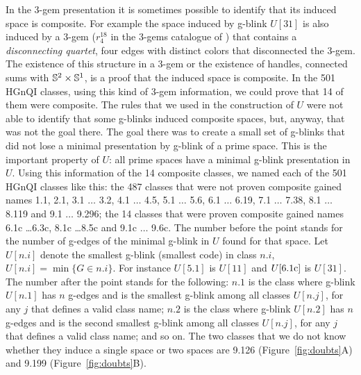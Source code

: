 \enlargethispage{0.5cm}
In the 3-gem presentation it is sometimes possible to identify that
its induced space is composite. For example the space induced by g-blink $U[31]$
is also induced by a 3-gem ($r_4^{18}$ in the 3-gems catalogue of \cite{Lins1995}) that
contains a {\it disconnecting quartet}, \ie four edges with distinct colors
that disconnected the 3-gem. The existence of this structure in a 3-gem
or the existence of handles, \ie connected sums with $\mathbb{S}^2 \times \mathbb{S}^1$,
is a proof that the induced space is composite. In the 501 HGnQI classes, using
this kind of 3-gem information, we could prove that 14 of them were composite. The
rules that we used in the construction of $U$ were not able to identify that
some g-blinks induced composite spaces, but, anyway, that was not the goal there. The
goal there was to create a small set of g-blinks that did not lose a minimal
presentation by g-blink of a prime space. This is the important property of $U$:
all prime spaces have a minimal g-blink presentation in $U$. Using this information
of the 14 composite classes, we named each of the 501 HGnQI classes like this:
the 487 classes that were not proven composite gained names 1.1, 2.1, 3.1  $\ldots$  3.2,
4.1 $\ldots$ 4.5, 5.1 $\ldots$ 5.6, 6.1 $\ldots$ 6.19, 7.1 $\ldots$ 7.38, 8.1 $\ldots$ 8.119
and 9.1 $\ldots$ 9.296; the 14 classes that were proven composite gained names 6.1c \ldots 6.3c,
8.1c \ldots 8.5c and 9.1c $\ldots$ 9.6c. The number before the point stands for
the number of g-edges of the minimal g-blink in $U$ found for that space.
Let $U[n.i]$ denote the smallest g-blink (\ie smallest code) in class $n.i$, \ie
$U[n.i] = \min\{G \in n.i\}$. For instance $U[5.1]$ is $U[11]$ and $U[6.1{\rm c}]$ is $U[31]$.
The number after the point stands for the following: $n.1$ is the class
where g-blink $U[n.1]$ has $n$ g-edges and is the smallest g-blink among all
classes $U[n.j]$, for any $j$ that defines a valid class name; $n.2$ is the class
where g-blink $U[n.2]$ has $n$ g-edges and is the second smallest g-blink among all
classes $U[n.j]$, for any $j$ that defines a valid class name; and so on. The two
classes that we do not know whether they induce a single space or two spaces are 9.126
(Figure~\ref{fig:doubts}A) and 9.199 (Figure~\ref{fig:doubts}B).

